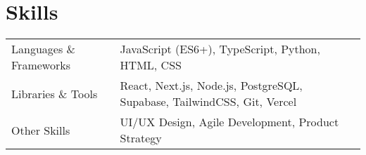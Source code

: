 \documentclass[a4paper, 10pt]{article}
\begin{document}
\section{Skills}
\begin{tabularx}{\linewidth}{@{}l X@{}}
Languages \& Frameworks &  \normalsize{JavaScript (ES6+), TypeScript, Python, HTML, CSS}\\
Libraries \& Tools &  \normalsize{React, Next.js, Node.js, PostgreSQL, Supabase, TailwindCSS, Git, Vercel}\\  
Other Skills &  \normalsize{UI/UX Design, Agile Development, Product Strategy}\\
\end{tabularx}
\end{document}
